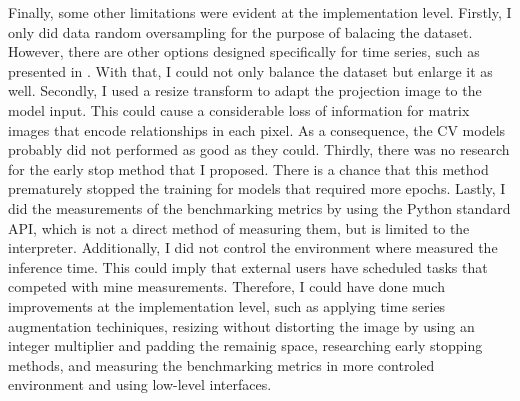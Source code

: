 Finally, some other limitations were evident at the implementation level. Firstly, I only did data random oversampling for the purpose of balacing the dataset. However, there are other options designed specifically for time series, such as presented in \cite{TimeSeriesAugmentation}. With that, I could not only balance the dataset but enlarge it as well. Secondly, I used a resize transform to adapt the projection image to the model input. This could cause a considerable loss of information for matrix images that encode relationships in each pixel. As a consequence, the \acrshort{CV} models probably did not performed as good as they could. Thirdly, there was no research for the early stop method that I proposed. There is a chance that this method prematurely stopped the training for models that required more epochs. Lastly, I did the measurements of the benchmarking metrics by using the Python standard API, which is not a direct method of measuring them, but is limited to the interpreter. Additionally, I did not control the environment where measured the inference time. This could imply that external users have scheduled tasks that competed with mine measurements. Therefore, I could have done much improvements at the implementation level, such as applying time series augmentation techiniques, resizing without distorting the image by using an integer multiplier and padding the remainig space, researching early stopping methods, and measuring the benchmarking metrics in more controled environment and using low-level interfaces.        
